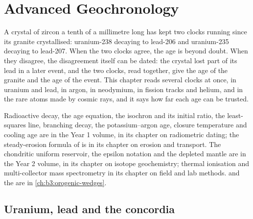 \chapter{Advanced Geochronology}\label{ch:b3:advanced-geochronology}

A crystal of zircon a tenth of a millimetre long has kept two clocks running
since its granite crystallised: uranium-238 decaying to lead-206 and
uranium-235 decaying to lead-207. When the two clocks agree, the age is
beyond doubt. When they disagree, the disagreement itself can be dated: the
crystal lost part of its lead in a later event, and the two clocks, read
together, give the age of the granite and the age of the event. This chapter
reads several clocks at once, in uranium and lead, in argon, in neodymium, in
fission tracks and helium, and in the rare atoms made by cosmic rays, and it
says how far each age can be trusted.

\begin{recall}
Radioactive decay, the age equation, the isochron and its initial ratio, the
least-squares line, branching decay, the potassium--argon age, closure
temperature and cooling age are in the Year 1 volume, in its chapter on
radiometric dating; the steady-erosion formula of  is in
its chapter on erosion and transport. The chondritic uniform reservoir, the
epsilon notation and the depleted mantle are in the Year 2 volume, in its
chapter on isotope geochemistry; thermal ionisation and multi-collector mass
spectrometry in its chapter on field and lab methods.  and
the  are in \cref{ch:b3:orogenic-wedges}.
\end{recall}

\section{Uranium, lead and the concordia}\label{sec:b3:advanced-geochronology:upb}

